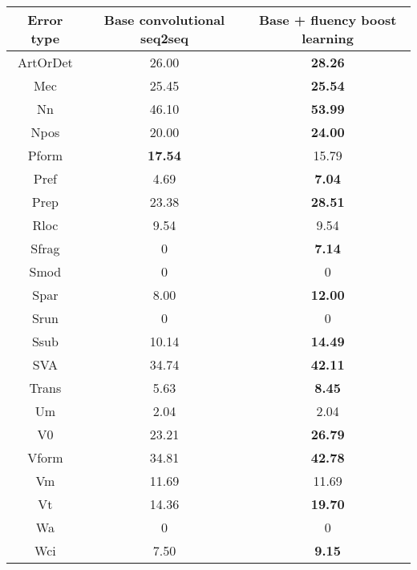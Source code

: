 \documentclass{article} \usepackage{MSRA_TR,times}
\begin{document}
\begin{table}[t]
\centering
\small
\begin{tabular}{c|c|c}
\hline
\bf Error type & \bf Base convolutional seq2seq & \bf Base + fluency boost learning \\ \hline
ArtOrDet   & 26.00                      & \bf 28.26              \\
Mec        & 25.45                      & \bf 25.54              \\
Nn         & 46.10                      & \bf 53.99              \\
Npos       & 20.00                      & \bf 24.00              \\
Pform      & \bf 17.54                      & 15.79              \\
Pref       & 4.69                       & \bf 7.04               \\
Prep       & 23.38                      & \bf  28.51              \\
Rloc       & 9.54                       & 9.54               \\
Sfrag      & 0                          & \bf 7.14               \\
Smod       & 0                          & 0                  \\
Spar       & 8.00                       & \bf 12.00              \\
Srun       & 0                          & 0                  \\
Ssub       & 10.14                      & \bf 14.49              \\
SVA        & 34.74                      & \bf 42.11              \\
Trans      & 5.63                       & \bf 8.45               \\
Um         & 2.04                       & 2.04               \\
V0         & 23.21                      & \bf 26.79              \\
Vform      & 34.81                      & \bf 42.78              \\
Vm         & 11.69                      & 11.69              \\
Vt         & 14.36                      & \bf 19.70              \\
Wa         & 0                          & 0                  \\
Wci        & 7.50                       & \bf 9.15               \\

\end{tabular}
\end{table}
\end{document}
